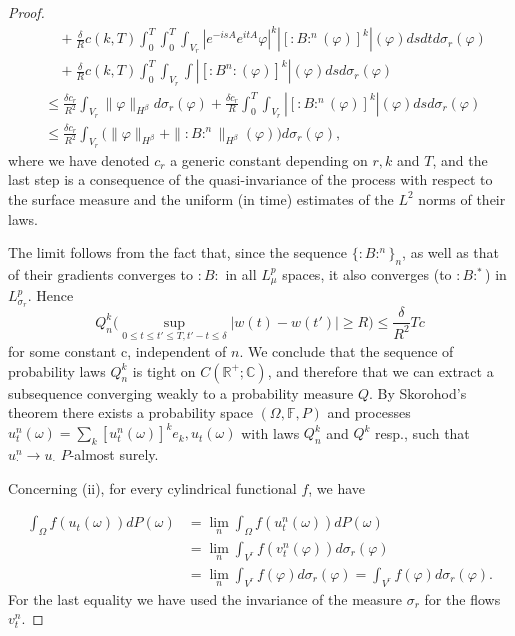 \documentclass[11pt,leqno]{amsart}
\begin{document}
\begin{proof}
\begin{align*}
&\quad +  \frac{\delta}{R} c(k,T)  \int_0^T\int_0^T { \int_{V_r} }  |e^{-isA}e^{itA}\varphi |^k |[:B:^n (\varphi )]^k |  (\varphi)ds dt d\sigma_r (\varphi )\\
& \quad +  \frac{\delta}{R} c(k,T) \int_0^T { \int_{V_r} } \int |[:B^n : (\varphi )]^k | (\varphi) ds d\sigma_r (\varphi )\\
& \leq \frac{\delta c_r}{R^2} \int_{V_r}  \| \varphi \|_{H^{\beta}} d\sigma_r (\varphi ) +  \frac{\delta c_r}{R}  \int_0^T { \int_{V_r} } |[:B :^n (  \varphi )]^k |(\varphi )ds d\sigma_r(\varphi)\\
& \leq \frac{\delta c_r}{R^2} \int_{V_r} \Big( \|\varphi\| _{H^{\beta}} + \| :B:^n \|_{H^{\beta}} (\varphi )\Big)d\sigma_r (\varphi ), 
\end{align*}
where we have denoted  $c_r$ a generic constant depending on $r, k$ and $T$,
 and the last step is a consequence of the quasi-invariance of the process with respect to the surface measure and the uniform (in time) estimates of the $L^2$ norms of their laws.
\color{black}





The limit follows from the fact that, since the sequence  $\{:B:^n\}_n$,  as well as that of  their gradients converges to $:B:$ in all $L^p _\mu$ spaces, it  also converges (to $:B:^\ast$) in $L^p_{\sigma_r}$.
Hence
$$Q_n^k \Big( \sup_{0\leq t\leq t' \leq T, t'-t\leq \delta}|w(t) -w(t' )|\geq R \Big) \leq  \frac{\delta}{R^2} Tc$$
for some constant c, independent of $n$.
We conclude that the sequence of  probability laws $Q_n^k$ is tight on  {$C({\mathbb R}^+;\mathbb{C})$,  }
and therefore that we can extract a subsequence converging weakly to a probability measure $Q$.
 By Skorohod's theorem there exists a probability space $(\Omega , \mathbb F, P)$ and processes $u_t^n (\omega )=\sum_k [u_t^n (\omega )]^k e_k , u_t (\omega )$ 
 with laws $Q_n^k$ and $Q^k$ resp., such that $u_{\cdot}^n \rightarrow u_{\cdot} $ $P$-almost surely.



Concerning (ii), for every cylindrical functional $f$, we have

\begin{align*}
 \int_{\Omega}  f(u_t ( \omega )) dP(\omega )&=\lim_n \int_\Omega  f(u_t^n (\omega ))dP(\omega )\\
 &= \lim_n \int_{V^r}  f(v_t^n (\varphi ))d\sigma_r (\varphi )\\
&=\lim_n \int_{V^r}  f(\varphi) d\sigma_r (\varphi) = \int_{V^r} f (\varphi)  d\sigma_r(\varphi).
\end{align*}
For the last equality we have used  the invariance of the measure $\sigma_r$ for the flows $v_t^n$.


\end{proof}
\end{document}
